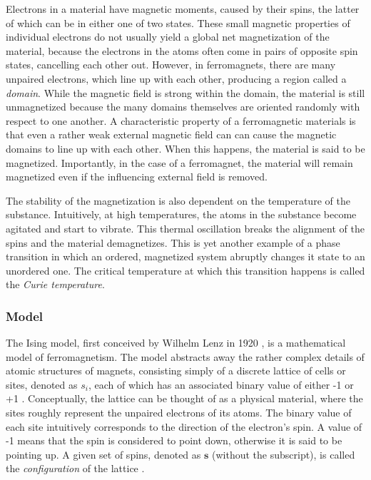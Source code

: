 \documentclass[12pt]{article}
\begin{document}
Electrons in a material have magnetic moments, caused by their spins, the latter of which can be in either one of two states. These small magnetic properties of individual electrons do not usually yield a global net magnetization of the material, because the electrons in the atoms often come in pairs of opposite spin states, cancelling each other out. However, in ferromagnets, there are many unpaired electrons, which line up with each other, producing a region called a \textit{domain}. While the magnetic field is strong within the domain, the material is still unmagnetized because the many domains themselves are oriented randomly with respect to one another. A characteristic property of a ferromagnetic materials is that even a rather weak external magnetic field can can cause the magnetic domains to line up with each other. When this happens, the material is said to be magnetized. Importantly, in the case of a ferromagnet, the material will remain magnetized even if the influencing external field is removed. 

The stability of the magnetization is also dependent on the temperature of the substance. Intuitively, at high temperatures, the atoms in the substance become agitated and start to vibrate. This thermal oscillation breaks the alignment of the spins and the material demagnetizes. This is yet another example of a phase transition in which an ordered, magnetized system abruptly changes it state to an unordered one. The critical temperature at which this transition happens is called the \textit{Curie temperature}.

\subsubsection{Model} 

The Ising model, first conceived by Wilhelm Lenz in 1920 \cite{ising-history}, is a mathematical model of ferromagnetism. The model abstracts away the rather complex details of atomic structures of magnets, consisting simply of a discrete lattice of cells or sites, denoted as $s_i$, each of which has an associated binary value of either -1 or +1 \cite{statistical-mechanics}. Conceptually, the lattice can be thought of as a physical material, where the sites roughly represent the unpaired electrons of its atoms. The binary value of each site intuitively corresponds to the direction of the electron's spin. A value of -1 means that the spin is considered to point down, otherwise it is said to be pointing up. A given set of spins, denoted as $\boldsymbol{s}$ (without the subscript), is called the \textit{configuration} of the lattice \cite{statistical-mechanics}.
\end{document}
